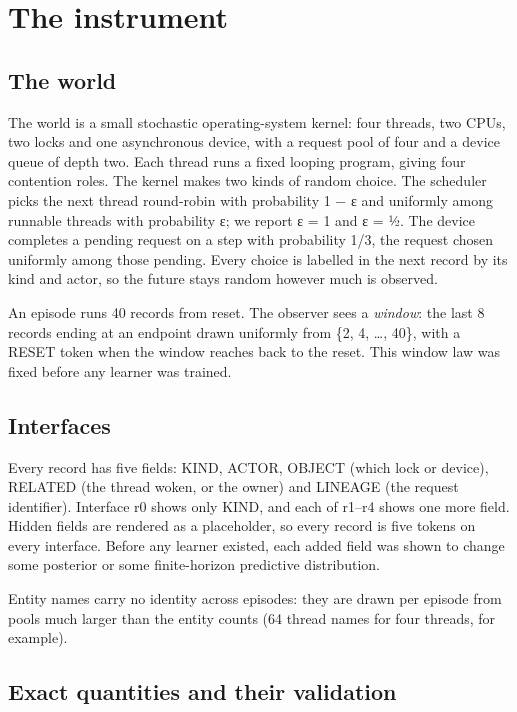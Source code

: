 \documentclass[10pt]{article}
\begin{document}
\hypertarget{the-instrument}{%
\section{The instrument}\label{the-instrument}}

\hypertarget{the-world}{%
\subsection{The world}\label{the-world}}

The world is a small stochastic operating-system kernel: four threads, two CPUs, two locks and one asynchronous device,
with a request pool of four and a device queue of depth two. Each thread runs a fixed looping program, giving four
contention roles. The kernel makes two kinds of random choice. The scheduler picks the next thread round-robin with
probability 1 − ε and uniformly among runnable threads with probability ε; we report ε = 1 and ε = ½. The device
completes a pending request on a step with probability 1/3, the request chosen uniformly among those pending. Every
choice is labelled in the next record by its kind and actor, so the future stays random however much is observed.

An episode runs 40 records from reset. The observer sees a \emph{window}: the last 8 records ending at an endpoint drawn
uniformly from \{2, 4, \ldots, 40\}, with a RESET token when the window reaches back to the reset. This window law was fixed
before any learner was trained.

\hypertarget{interfaces}{%
\subsection{Interfaces}\label{interfaces}}

Every record has five fields: KIND, ACTOR, OBJECT (which lock or device), RELATED (the thread woken, or the owner) and
LINEAGE (the request identifier). Interface r0 shows only KIND, and each of r1--r4 shows one more field. Hidden fields
are rendered as a placeholder, so every record is five tokens on every interface. Before any learner existed, each added
field was shown to change some posterior or some finite-horizon predictive distribution.

Entity names carry no identity across episodes: they are drawn per episode from pools much larger than the entity
counts (64 thread names for four threads, for example).

\hypertarget{exact-quantities-and-their-validation}{%
\subsection{Exact quantities and their validation}\label{exact-quantities-and-their-validation}}
\end{document}
